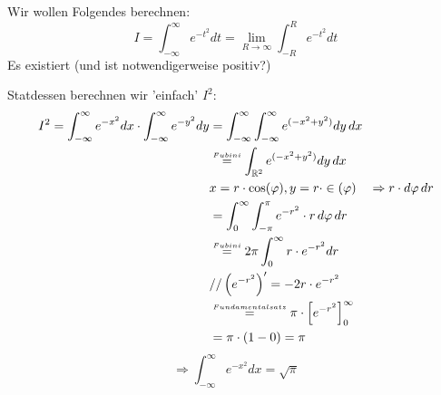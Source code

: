 \documentclass[main.tex]{subfiles}
\begin{document}
\begin{Beispiel}[Anwendung]
  Wir wollen Folgendes berechnen:
  $$I = \int_{- \infty}^\infty e ^{-t^2}dt = \lim \limits_{R \to \infty} \int_{-R}^R e ^{-t^2}dt$$
  Es existiert (und ist notwendigerweise positiv?)

  Statdessen berechnen wir 'einfach' $I^2$:
  $$\begin{aligned}
    I^2 = \int_{- \infty}^\infty e ^{-x^2}dx \cdot \int_{- \infty}^\infty e ^{-y^2}dy & = \int_{- \infty}^\infty \int_{- \infty}^\infty e ^{(-x^2 + y^2)}dy \, dx \\
    & \stackrel{\scriptscriptstyle Fubini}{=} \int_{\mathbb{R}^2} e ^{(-x^2 + y^2)}dy \, dx \\
    & x = r \cdot \cos(\varphi) , y = r \cdot \in(\varphi) \quad \Rightarrow r \cdot d \varphi \, dr \\
    & = \int_0^\infty \int_{-\pi}^\pi e^{-r^2} \cdot r \, d\varphi \, d r \\
    & \stackrel{\scriptscriptstyle Fubini}{=} 2 \pi \int_0^\infty r \cdot e^{-r^2} dr \\
    & //\left(e^{-r^2}\right)' = -2r\cdot e^{-r^2} \\
    & \stackrel{\scriptscriptstyle Fundamentalsatz}{=} \pi \cdot \left[e^{-r^2} \right]_0^\infty \\
    & = \pi \cdot (1-0) = \pi
  \end{aligned}$$
  $$\Rightarrow \int_{- \infty}^\infty e ^{-x^2}dx = \sqrt{\pi}$$
\end{Beispiel}
\end{document}
